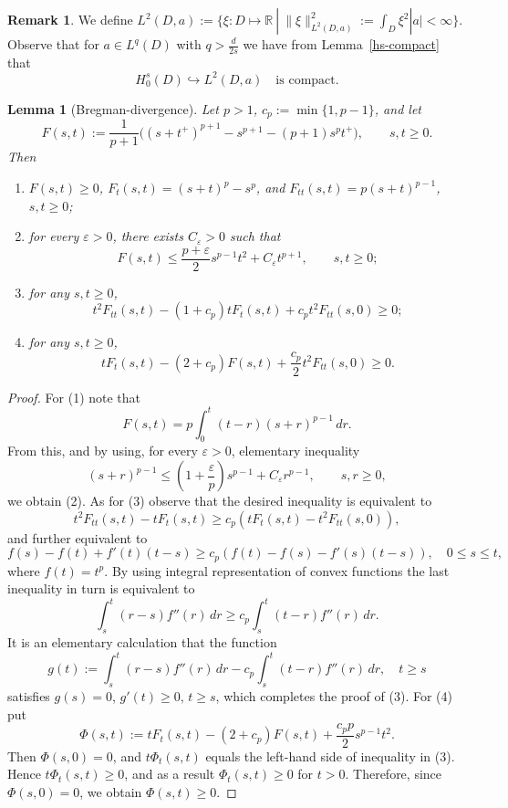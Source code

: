 \documentclass[11pt,a4paper,reqno]{amsart}
\newtheorem{lemma}[theorem]{\bf Lemma}
\theoremstyle{definition}
\newtheorem{remark}[theorem]{Remark}
\numberwithin{equation}{section}
\begin{document}
\begin{remark}\label{l2-compact}
We define $L^2(D,a):=\{\xi: D\mapsto \mathbb{R}\ |\ \|\xi\|^2_{L^2(D,a)}:=\int_D\xi^2|a|<\infty\}$.
Observe that for $a\in L^q(D)$ with $q>\frac{d}{2s}$ we have from Lemma~\ref{hs-compact} that 
\[
H^s_0(D)\hookrightarrow L^2(D,a)\quad\text{is compact}.
\]
\end{remark}


\begin{lemma}[Bregman-divergence]
\label{lm.algebraic}
Let $p>1$, $c_p:=\min\{1,p-1\}$, and let
\begin{equation}
\label{eq.efff}
F(s,t):=\frac{1}{p+1}
\Big((s+t^+)^{p+1}-s^{p+1}-(p+1)s^p t^+\Big),
\qquad s,t\ge0.
\end{equation}
Then
\begin{enumerate}
\item[(1)] $F(s,t)\ge 0$, $F_t(s,t)=(s+t)^p-s^p$, and  $F_{tt}(s,t)=p(s+t)^{p-1}$, $s,t\ge 0$; 
\item[(2)]
for every $\varepsilon>0$, there exists $C_\varepsilon>0$ such that
\[
F(s,t)\leq
\frac{p+\varepsilon}{2}s^{p-1}t^2+C_\varepsilon t^{p+1},
\qquad s,t\ge0;
\]
\item[(3)]  for any $s,t\ge 0$,
\[
t^2 F_{t t}(s, t)-\left(1+c_p\right) t F_t(s, t)+c_p t^2 F_{t t}(s, 0)\ge 0;
\]
\item[(4)] for any $s,t\ge 0$,
\[
tF_t(s,t)-(2+c_p)F(s,t)
+
\frac{c_p}{2} t^2 F_{t t}(s, 0)\ge0.
\]
\end{enumerate}
\end{lemma}

\begin{proof}
For (1) note that
\[
F(s,t)=p\int_0^t(t-r)(s+r)^{p-1}\,dr .
\]
From this, and by using, for every $\varepsilon>0$, elementary inequality 
\[
(s+r)^{p-1}
\leq
\left(1+\frac{\varepsilon}{p}\right)s^{p-1}
+C_\varepsilon r^{p-1},
\qquad s,r\ge0,
\]
we obtain (2).
As for (3) observe that the desired inequality is equivalent to 
$$
t^2 F_{t t}(s, t)-tF_t(s, t) \geq c_p\left(tF_t(s, t)-t^2 F_{t t}(s, 0)\right),
$$
and further equivalent to 
\[
f(s)-f(t)+f'(t)(t-s)
\geq
c_p\left(f(t)-f(s)-f'(s)(t-s)\right),\quad 0\le s\le t,
\]
where $f(t)=t^p$.
By using integral representation of convex functions the last inequality  in turn is equivalent to
\[
\int_s^t (r-s)f''(r)\,dr
\geq
c_p \int_s^t (t-r)f''(r)\,dr.
\]
It is an elementary calculation that the function
\[
g(t):=
\int_s^t (r-s)f''(r)\,dr-
c_p\int_s^t (t-r)f''(r)\,dr,\quad t\ge s
\]
satisfies $g(s)=0$, $g'(t)\ge 0,\, t\ge s$, which completes the proof of (3).
For (4) put
\[
\Phi(s,t):=
tF_t(s,t)-(2+c_p)F(s,t)
+\frac{c_pp}{2}s^{p-1}t^2 .
\]
Then $\Phi(s,0)=0$, and $t\Phi_t(s,t)$ equals the left-hand side of inequality in (3).
Hence $t\Phi_t(s,t)\ge0$, and as a result  $\Phi_t(s,t)\ge0$ for
$t>0$. Therefore, since $\Phi(s,0)=0$, we obtain $\Phi(s,t)\ge0$.
\end{proof}
\end{document}

